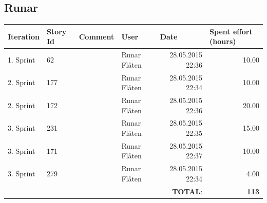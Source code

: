 \documentclass[a4paper]{article}
\begin{document}
\begin{landscape}
\subsection{Runar}
\begin{tabular}{|l|l|l|l|r|r|}
\hline
\textbf{Iteration} & \textbf{Story Id} & \textbf{Comment} & \textbf{User} & \multicolumn{1}{l|}{\textbf{Date}} & \multicolumn{1}{l|}{\textbf{Spent effort (hours)}} \\ \hline
1. Sprint & 62 &  & Runar Flåten & 28.05.2015 22:36 & 10.00 \\ \hline
2. Sprint & 177 &  & Runar Flåten & 28.05.2015 22:34 & 10.00 \\ \hline
2. Sprint & 172 &  & Runar Flåten & 28.05.2015 22:36 & 20.00 \\ \hline
3. Sprint & 231 &  & Runar Flåten & 28.05.2015 22:35 & 15.00 \\ \hline
3. Sprint & 171 &  & Runar Flåten & 28.05.2015 22:37 & 10.00 \\ \hline
3. Sprint & 279 &  & Runar Flåten & 28.05.2015 22:34 & 4.00 \\ \hline
 & & & &\textbf{TOTAL}: & \textbf{113} \\ \hline
\end{tabular}




\end{landscape}
\end{document}
